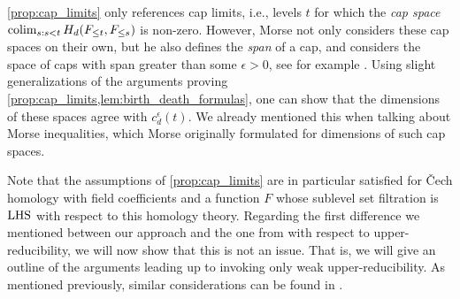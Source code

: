 \begin{rem}
	\cref{prop:cap_limits} only references cap limits, i.e., levels $t$ for which the \emph{cap space} $\operatorname*{colim}_{s: s < t} H_{d}(F_{\leq t}, F_{\leq s})$ is non-zero.
	However, Morse not only considers these cap spaces on their own, but he also defines the \emph{span} of a cap, and considers the space of caps with span greater than some $\epsilon > 0$, see for example \cite[Section 11]{Morse.1940}.
	Using slight generalizations of the arguments proving \cref{prop:cap_limits,lem:birth_death_formulas}, one can show that the dimensions of these spaces agree with $c_{d}^{\epsilon}(t)$.
	We already mentioned this when talking about Morse inequalities, which Morse originally formulated for dimensions of such cap spaces.
\end{rem}

Note that the assumptions of \cref{prop:cap_limits} are in particular satisfied for \v{C}ech homology with field coefficients and a function $F$ whose sublevel set filtration is $\mathrm{LHS}$ with respect to this homology theory.
Regarding the first difference we mentioned between our approach and the one from \cite[Theorem 8.1]{Morse.1938} with respect to upper-reducibility, we will now show that this is not an issue.
That is, we will give an outline of the arguments leading up to \cite[Theorem 8.1]{Morse.1938} invoking only weak upper-reducibility.
As mentioned previously, similar considerations can be found in \cite[Remark II.6.3]{Struwe.1988}.
